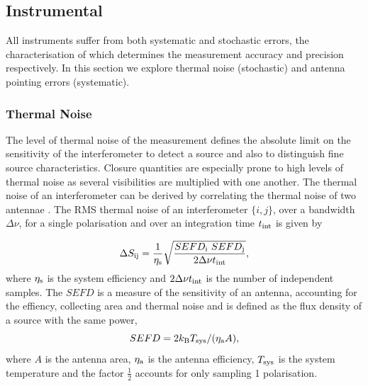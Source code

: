 \subsection{Instrumental}\label{sec:instrument}

All instruments suffer from both systematic and stochastic errors, the characterisation of which determines the measurement accuracy and precision respectively. In this section we explore thermal noise (stochastic) and antenna pointing errors (systematic). 

\subsubsection{Thermal Noise}


The level of thermal noise of the measurement defines the absolute limit on the sensitivity of the interferometer to detect a source and also to distinguish fine source characteristics. Closure quantities are especially prone to high levels of thermal noise as several visibilities are multiplied with one another. The thermal noise of an interferometer can be derived by correlating the thermal noise of two antennae \citep*{Wrobel_1999}. The  RMS thermal noise of an interferometer $\{i,j\}$, over a bandwidth $\Delta \nu$, for a single polarisation and over an integration time $t_{\rm int}$ is given by 

\begin{equation}
 \Delta S_{\rm ij} = \frac{1}{\eta_{\rm s}}\sqrt{\frac{SEFD_{\rm i}\ SEFD_{\rm j}}{2 \Delta \nu t_{\rm int}}},  
\end{equation}
where $\eta_{\rm s}$ is the system efficiency and $2 \Delta \nu t_{\rm int}$ is the number of independent samples. The $SEFD$ is a measure of the sensitivity of an antenna, accounting for the effiency, collecting area and thermal noise and is defined as the flux density of a source with the same power,
\begin{equation}
 SEFD = 2 k_{\rm B} T_{\rm sys} / (\eta_{\rm a} A),
\end{equation}
where $A$ is the antenna area, $\eta_{\rm a}$ is the antenna efficiency, $T_{\rm sys}$ is the system temperature and the factor $\frac{1}{2}$ accounts for only sampling 1 polarisation.


